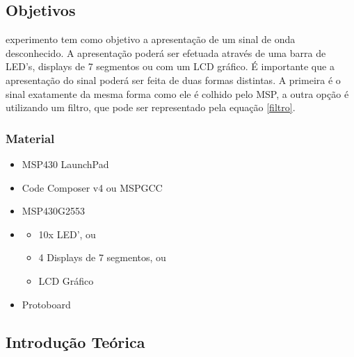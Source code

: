 ﻿%



%
%
\subsection{Objetivos}\label{obj}

 experimento tem como objetivo a apresentação de um sinal de onda desconhecido. A apresentação poderá ser efetuada através de uma barra de LED's, displays de 7 segmentos ou com um LCD gráfico. É importante que a apresentação do sinal poderá ser feita de duas formas distintas. A primeira é o sinal exatamente da mesma forma como ele é colhido pelo MSP, a outra opção é utilizando um filtro, que pode ser representado pela equação \ref{filtro}.
	

\subsubsection{Material}\label{mat}
	
\begin{itemize}
	\item MSP430 LaunchPad
	\item Code Composer v4 ou MSPGCC
	\item MSP430G2553
	\item	\begin{itemize}
				\item 10x LED', ou
				\item 4 Displays de 7 segmentos, ou
				\item LCD Gráfico
			\end{itemize}
	\item Protoboard
\end{itemize}	
	
\subsection{Introdução Teórica}\label{intro}
%
%

